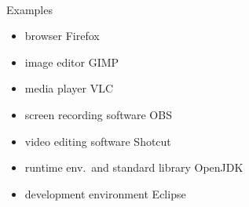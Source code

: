 \begin{frame}{\insertsubsection\ \mytitlesource{\sommerville}}
\begin{fancycolumns}
\begin{example}{Examples}
\begin{itemize}
				\item browser Firefox
				\item image editor GIMP
				\item media player VLC
				\item screen recording software OBS
				\item video editing software Shotcut
				\item runtime env.\ and standard library OpenJDK
				\item development environment Eclipse
			\end{itemize} %
		\end{example}
	\end{fancycolumns}
\end{frame}

